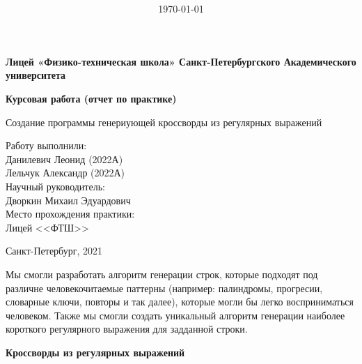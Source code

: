 \documentclass[12pt]{article}
\title{\bf \ReportTheme}
\author{\it \ReportAuthor}
\date{\today}
\begin{document}

    \begin{center}
    \large { {\bf Лицей «Физико-техническая школа»  Санкт-Петербургского Академического университета   } } 
    
    \vspace*{6\baselineskip}
    
    \vfill
    \large { {\bf Курсовая работа (отчет по практике) } } 
    
    \vspace*{6\baselineskip}
    
    Создание программы генериующей кроссворды из регулярных выражений \\
    \vspace*{3\baselineskip}
    
    \end{center}        
    \begin{flushright}
        Работу выполнили: \\
        Данилевич Леонид (2022А) \\
        Лельчук Александр (2022А) \\
        Научный руководитель: \\
        Дворкин Михаил Эдуардович \\
        Место прохождения практики: \\
        Лицей <<ФТШ>>
    \end{flushright}
    \vspace*{5\baselineskip}
    \begin{center}
        Санкт-Петербург, 2021
    \end{center}        
    \newpage %
     Мы смогли разработать алгоритм генерации строк, которые подходят под различне человекочитаемые паттерны (например: палиндромы, прогресии, словарные ключи, повторы и так далее), которые могли бы легко восприниматься человеком.
     Также мы смогли создать уникальный алгоритм генерации наиболее короткого регулярного выражения для задданной строки.

    
    \newpage %
    { \center \bf Кроссворды из регулярных выражений }
\tableofcontents
    \newpage %
\end{document}

